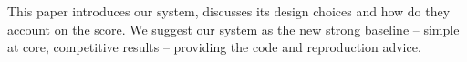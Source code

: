 This paper introduces our system, discusses its design choices and how do they account on the score.
We suggest our system as the new strong baseline -- simple at core, competitive results -- providing the code and reproduction advice.

\label{sec:relwork}
\label{avscore}

